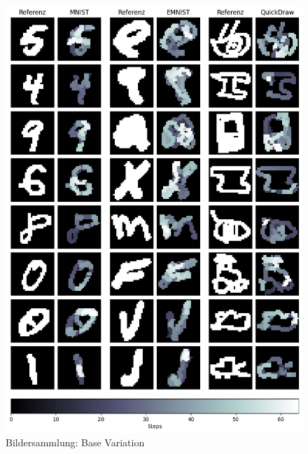 \begin{figure}[!ht]
    \centering
    \includegraphics[width=\textwidth]{images/resultate/base.png}
    \caption{Bildersammlung: Base Variation}\label{fig:r-base}
\end{figure}

\newpage

